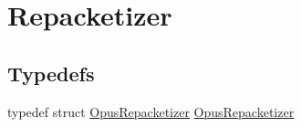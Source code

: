 \hypertarget{group__opus__repacketizer}{}\section{Repacketizer}
\label{group__opus__repacketizer}
\subsection*{Typedefs}
\begin{DoxyCompactItemize}
\item 
typedef struct \mbox{\hyperlink{group__opus__repacketizer_ga1f85070a64bcbf5bf24f5ccb80323e7b}{Opus\+Repacketizer}} \mbox{\hyperlink{group__opus__repacketizer_ga1f85070a64bcbf5bf24f5ccb80323e7b}{Opus\+Repacketizer}}
\end{DoxyCompactItemize}
